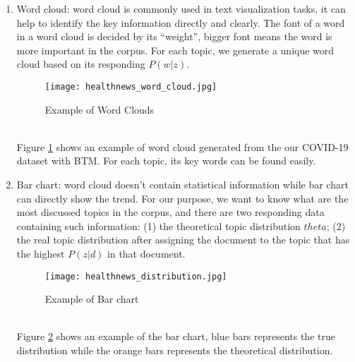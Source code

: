 \begin{enumerate}
    \item Word cloud: word cloud is commonly used in text visualization tasks, it can help to identify the key information directly and clearly. The font of a word in a word cloud is decided by its ``weight'', bigger font means the word is more important in the corpus. For each topic, we generate a unique word cloud based on its responding $P(w|z)$.
    \begin{figure}[!htbp]
        \centering
        \texttt{[image: healthnews\_word\_cloud.jpg]}
        \caption{Example of Word Clouds}
        \label{fig:wordcloud}
    \end{figure}
    \\Figure \ref{fig:wordcloud} shows an example of word cloud generated from the our COVID-19 dataset with BTM. For each topic, its key words can be found easily.
    \item Bar chart: word cloud doesn't contain statistical information while bar chart can directly show the trend. For our purpose, we want to know what are the most discussed topics in the corpus, and there are two responding data containing such information: (1) the theoretical topic distribution $theta$; (2) the real topic distribution after assigning the document to the topic that has the highest $P(z|d)$ in that document.
    \begin{figure}[!htbp]
        \centering
        \texttt{[image: healthnews\_distribution.jpg]}
        \caption{Example of Bar chart}
        \label{fig:barchart}
    \end{figure}
    \\Figure \ref{fig:barchart} shows an example of the bar chart, blue bars represents the true distribution while the orange bars represents the theoretical distribution.
\end{enumerate}